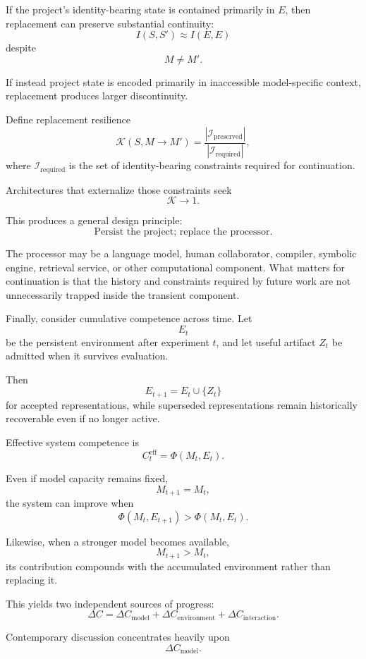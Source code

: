 \documentclass[11pt]{article}
\begin{document}
If the project's identity-bearing state is contained primarily in \(E\), then replacement can preserve substantial continuity:
\[
    I(S,S')
    \approx
    I(E,E)
\]
despite
\[
    M\neq M'.
\]

If instead project state is encoded primarily in inaccessible model-specific context, replacement produces larger discontinuity.

Define replacement resilience
\[
    \mathcal{K}(S,M\rightarrow M')
    =
    \frac{
        |\mathcal{I}_{\mathrm{preserved}}|
    }{
        |\mathcal{I}_{\mathrm{required}}|
    },
\]
where \(\mathcal{I}_{\mathrm{required}}\) is the set of identity-bearing constraints required for continuation.

Architectures that externalize those constraints seek
\[
    \mathcal{K}\rightarrow1.
\]

This produces a general design principle:
\[
    \boxed{
    \text{Persist the project; replace the processor.}
    }
\]

The processor may be a language model, human collaborator, compiler, symbolic engine, retrieval service, or other computational component. What matters for continuation is that the history and constraints required by future work are not unnecessarily trapped inside the transient component.

Finally, consider cumulative competence across time. Let
\[
    E_t
\]
be the persistent environment after experiment \(t\), and let useful artifact \(Z_t\) be admitted when it survives evaluation.

Then
\[
    E_{t+1}
    =
    E_t\cup\{Z_t\}
\]
for accepted representations, while superseded representations remain historically recoverable even if no longer active.

Effective system competence is
\[
    C_t^{\mathrm{eff}}
    =
    \Phi(M_t,E_t).
\]

Even if model capacity remains fixed,
\[
    M_{t+1}=M_t,
\]
the system can improve when
\[
    \Phi(M_t,E_{t+1})
    >
    \Phi(M_t,E_t).
\]

Likewise, when a stronger model becomes available,
\[
    M_{t+1}>M_t,
\]
its contribution compounds with the accumulated environment rather than replacing it.

This yields two independent sources of progress:
\[
    \Delta C
    =
    \Delta C_{\mathrm{model}}
    +
    \Delta C_{\mathrm{environment}}
    +
    \Delta C_{\mathrm{interaction}}.
\]

Contemporary discussion concentrates heavily upon
\[
    \Delta C_{\mathrm{model}}.
\]
\end{document}
